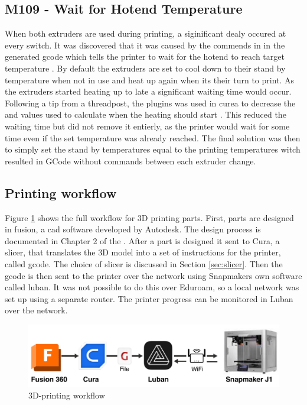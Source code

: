 \subsection{M109 - Wait for Hotend Temperature}
When both extruders are used during printing, a siginificant dealy occured at every switch.
It was discovered that it was caused by the  commends in in the generated \gls{gcode} which tells the printer to wait for the hotend to reach target temperature \cite{thinkyheadWaitHotendTemperature2023}.
By default the extruders are set to cool down to their stand by temperature when not in use and heat up again when its their turn to print.
As the extruders started heating up to late a significant waiting time would occur.
Following a tip from a threadpost, the  plugins was used in curea to decrease the  and  values used to calculate when the heating should start \cite{valiantReplyStandbyTemperature2022} \cite{fieldofviewPrinterSettingsUltimaker}.
This reduced the waiting time but did not remove it entierly, as the printer would wait for some time even if the set temperature was already reached.
The final solution was then to simply set the stand by temperatures equal to the printing temperatures witch resulted in GCode without  commands between each extruder change.

\subsection{Printing workflow}
Figure \ref{fig:3dp_workflow} shows the full workflow for 3D printing parts.
First, parts are designed in \gls{fusion}, a \gls{cad} software developed by Autodesk.
The design process is documented in Chapter 2 of the \preproject.
After a part is designed it sent to Cura, a slicer, that translates the 3D model into a set of instructions for the printer, called \gls{gcode}.
The choice of slicer is discussed in Section \ref{sec:slicer}.
Then the \gls{gcode} is then sent to the printer over the network using Snapmakers own software called \gls{luban}.
It was not possible to do this over Eduroam, so a local network was set up using a separate router.
The printer progress can be monitored in Luban over the network.


\begin{figure}[H]
    \centering
    \includegraphics[width=\textwidth]{figures/3d_print/pipeline.pdf}
    \caption{3D-printing workflow \cite{autodeskFusion360Logo} \cite{delaragoCuraLogo2022} \cite{jupi007GcodeIconProposal2020} \cite{snapmakerSnapmakerLogo2020} \cite{snapmakerSnapmakerJ1High}}
    \label{fig:3dp_workflow}
\end{figure}

